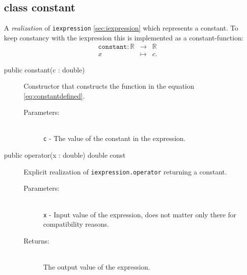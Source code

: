 \documentclass[a4paper,11pt]{kth-mag}
\newcommand{\RR}{\ensuremath{\mathbb{R}}}
\begin{document}
\subsection{class constant} A \emph{realization} of \texttt{iexpression}
\ref{sec:iexpression} which represents a constant. To keep constancy with the
iexpression this is implemented as a constant-function:
\begin{eqnarray}
    \label{eq:constantdefined}
    \texttt{constant}: \RR &\rightarrow& \RR \nonumber \\
    x &\mapsto& c .
\end{eqnarray}
\begin{description}
    \item[public constant(c : double)] Constructor 
    that constructs the function in the equation \ref{eq:constantdefined}. 
    \begin{description}
        \item[Parameters:]~\\
            \verb+c+ - The value of the constant in the expression.
    \end{description}
\end{description}
\begin{description}
    \item[public operator(x : double) double const] 
    Explicit realization of \texttt{iexpression.operator} returning a
    constant.
    \begin{description}
        \item[Parameters:]~\\
            \verb+x+ - Input value of the expression, does not matter only
            there for compatibility reasons. 
        \item[Returns:]~\\
            The output value of the expression.
    \end{description}
\end{description}
\end{document}
